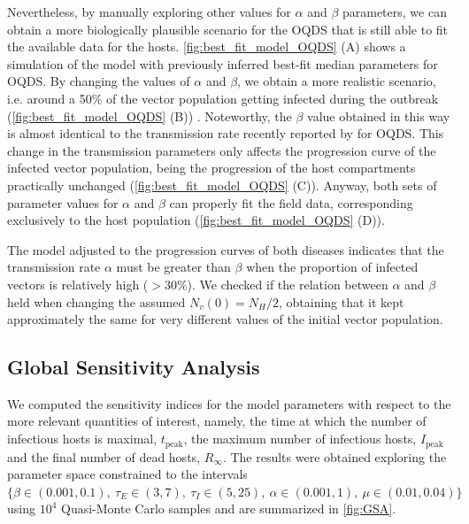 Nevertheless, by manually exploring other values for $\alpha$ and $\beta$
parameters, we can obtain a more biologically plausible scenario for the OQDS
that is still able to fit the available data for the hosts.
\cref{fig:best_fit_model_OQDS} (A) shows a simulation of the model with
previously inferred best-fit median parameters for OQDS. By changing the values
of $\alpha$ and $\beta$, we obtain a more realistic scenario, i.e. around a
50\% of the vector population getting infected during the outbreak
(\cref{fig:best_fit_model_OQDS} (B)) \cite{Cavalieri2019,
    cornara2017transmission}. Noteworthy, the $\beta$ value obtained in this
way
is almost identical to the transmission rate recently reported by
\cite{Bodino2021} for OQDS. This change in the transmission parameters only
affects the progression curve of the infected vector population, being the
progression of the host compartments practically unchanged
(\cref{fig:best_fit_model_OQDS} (C)). Anyway, both sets of parameter values for
$\alpha$ and $\beta$ can properly fit the field data, corresponding exclusively
to the	host population (\cref{fig:best_fit_model_OQDS} (D)).

The model adjusted to the progression curves of both diseases indicates
that the transmission rate $\alpha$ must be greater than $\beta$ when the
proportion of infected vectors is relatively high ($>30\%$). We checked if the
relation between $\alpha$ and $\beta$ held when changing the assumed
$N_v(0)=N_H/2$, obtaining that it kept approximately the same for very
different values of the initial vector population.

\subsection{Global Sensitivity Analysis}

We computed the sensitivity indices for the model parameters with respect
to the more relevant quantities of interest, namely, the time at which the
number of infectious hosts is maximal, $t_{\textrm{peak}}$, the maximum number
of infectious hosts, $I_{\textrm{peak}}$ and the final number of dead hosts,
$R_\infty$. The results were obtained exploring the parameter space constrained
to the intervals $\{\beta\in(0.001, 0.1), \ \tau_E\in(3,7), \ \tau_I\in(5,25),
    \ \alpha\in(0.001, 1), \ \mu\in(0.01, 0.04)\}$ using $10^4$ Quasi-Monte
Carlo
samples and are summarized in \cref{fig:GSA}.


